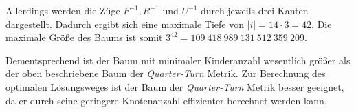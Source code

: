 \documentclass[12pt,a4paper, usenames, dvipsnames]{article}
\theoremstyle{mystyle}
\theoremstyle{definition}
\begin{document}
Allerdings werden die Züge $F^{-1}, R^{-1}$ und $U^{-1}$ durch jeweils drei Kanten dargestellt. Dadurch ergibt sich eine maximale Tiefe von $|i| = 14 \cdot 3 = 42$. Die maximale Größe des Baums ist somit $3^{42} = 109\ 418\ 989\ 131\ 512\ 359\ 209$. 

Dementsprechend ist der Baum mit minimaler Kinderanzahl wesentlich größer als der oben beschriebene Baum der \textit{Quarter-Turn} Metrik. Zur Berechnung des optimalen Lösungsweges ist der Baum der \textit{Quarter-Turn} Metrik besser geeignet, da er durch seine geringere Knotenanzahl effizienter berechnet werden kann.









\end{document}
